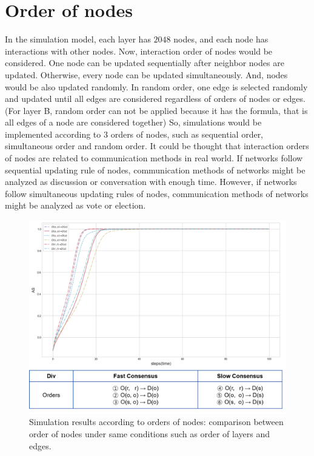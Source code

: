 \section{Order of nodes}
In the simulation model, each layer has $2048$ nodes, and each node has interactions with other nodes. Now, interaction order of nodes would be considered. One node can be updated sequentially after neighbor nodes are updated. Otherwise, every node can be updated simultaneously. And, nodes would be also updated randomly. In random order, one edge is selected randomly and updated until all edges are considered regardless of orders of nodes or edges.(For layer B, random order can not be applied because it has the formula, that is all edges of a node are considered together) So, simulations would be implemented according to $3$ orders of nodes, such as sequential order, simultaneous order and random order.  It could be thought that interaction orders of nodes are related to communication methods in real world. If networks follow sequential updating rule of nodes, communication methods of networks might be analyzed as discussion or conversation with enough time. However, if networks follow simultaneous updating rules of nodes, communication methods of networks might be analyzed as vote or election. 

\begin{figure}[!htb]
	\centering
	\includegraphics[width=\hsize]{figure/chap4_nodeorder.png}
	\caption{Simulation results according to orders of nodes: comparison between order of nodes under same conditions such as order of layers and edges.}
	\label{chap4_nodeorder}
\end{figure}

